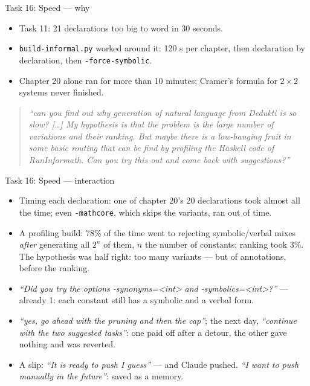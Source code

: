 \documentclass[10pt,aspectratio=169]{beamer}
\newcommand{\bad}[1]{\textcolor{warn}{#1}}
\newcommand{\prompt}[1]{\begin{quote}\small\itshape ``#1''\end{quote}}
\begin{document}
\begin{frame}{Task 16: Speed --- why}
  \begin{itemize}
    \item Task 11: 21 declarations too big to word in 30 seconds.
    \item \texttt{build-informal.py} worked around it: 120 s per chapter, then
          declaration by declaration, then \texttt{-force-symbolic}.
    \item Chapter 20 alone ran for more than 10 minutes; Cramer's formula for
          $2 \times 2$ systems never finished.
  \end{itemize}
  \prompt{can you find out why generation of natural language from Dedukti is so
    slow? [\dots] My hypothesis is that the problem is the large number of variations
    and their ranking. But maybe there is a low-hanging fruit in some basic routing
    that can be find by profiling the Haskell code of RunInformath. Can you try this
    out and come back with suggestions?}
\end{frame}

\begin{frame}{Task 16: Speed --- interaction}
  \begin{itemize}\small
    \item Timing each declaration: one of chapter 20's 20 declarations took almost all the time; even
          \texttt{-mathcore}, which skips the variants, ran out of time.
    \item A profiling build: \bad{78\%} of the time went to rejecting symbolic/verbal
          mixes \emph{after} generating all $2^n$ of them, $n$ the number of constants;
          ranking took 3\%. The hypothesis was half right: too many variants ---
          but of annotations, before the ranking.
    \item \emph{``Did you try the options -synonyms=<int> and -symbolics=<int>?''} ---
          already 1: each constant still has a symbolic and a verbal form.
    \item \emph{``yes, go ahead with the pruning and then the cap''}; the next day,
          \emph{``continue with the two suggested tasks''}: one paid off after a detour,
          the other gave nothing and was reverted.
    \item A slip: \emph{``It is ready to push I guess''} --- and Claude pushed.
          \emph{``I want to push manually in the future''}: saved as a memory.
  \end{itemize}
\end{frame}
\end{document}
